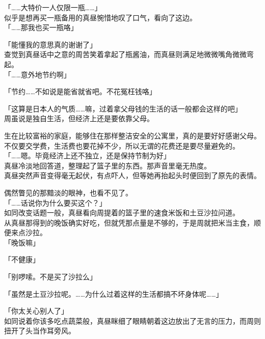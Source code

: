 「……大特价一人仅限一瓶……」\\

似乎是想再买一瓶备用的真昼惋惜地叹了口气，看向了这边。\\

「……那我也买一瓶咯」

「能懂我的意思真的谢谢了」\\

查觉到真昼话中之意的周苦笑着拿起了瓶酱油，而真昼则满足地微微嘴角微微弯起。\\

「……意外地节约啊」

「节约……不如说是能省就省吧。不花冤枉钱咯」

「这算是日本人的气质……嘛，过着拿父母钱的生活的话一般都会这样的吧」\\

周虽说是独自生活，但经济上还是要依靠父母。

生在比较富裕的家庭，能够住在那样整洁安全的公寓里，真的是要好好感谢父母。不仅要交学费，生活费也要花掉不少，所以无谓的花费还是要尽量避免的。\\

「……嗯。毕竟经济上还不独立，还是保持节制为好」\\

真昼冷淡地回答道，整理起了篮子里的东西。那声音里毫无热度。\\

真昼突然声音变得毫无起伏，有点吓人，但等她再抬起头时便回到了原先的表情。

偶然瞥见的那黯淡的眼神，也看不见了。\\

「……话说你为什么要买这个？」\\

如同改变话题一般，真昼看向周提着的篮子里的速食米饭和土豆沙拉问道。\\

从真昼那得到的晚饭确实好吃，但就凭那点量是不够的，于是周就把米当主食，顺便来点沙拉。\\

「晚饭嘛」

「不健康」

「别啰嗦。不是买了沙拉么」

「虽然是土豆沙拉呢。……为什么过着这样的生活都搞不坏身体呢……」

「你太关心别人了」\\

如同说着你该多吃点蔬菜般，真昼眯细了眼睛朝着这边放出了无言的压力，而周则扭开了头当作耳旁风。\\

